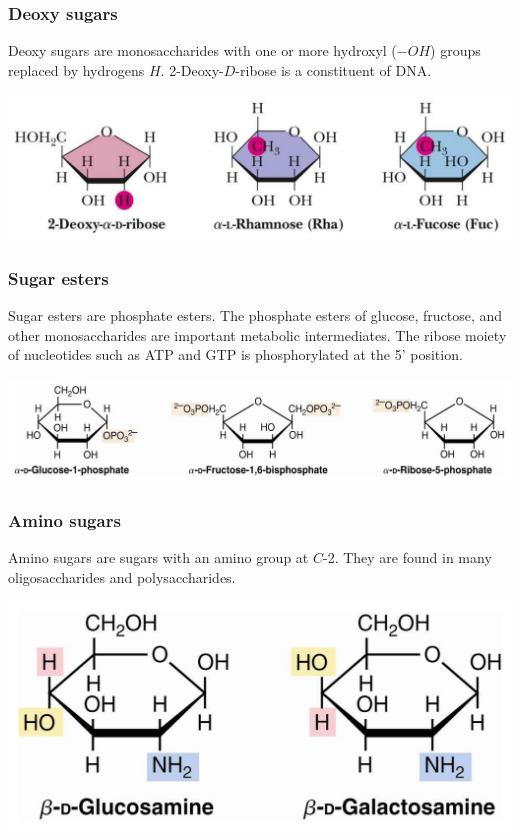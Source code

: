 \documentclass[11pt]{article}
\begin{document}
\newpage
\subsubsection{Deoxy sugars}
\label{sec:orga265d68}
Deoxy sugars are monosaccharides with one or more hydroxyl (\(-OH\)) groups replaced by hydrogens \(H\). 2-Deoxy-\(D\)-ribose is a constituent of DNA.
\begin{center}
\includegraphics[width=.9\linewidth]{./images/deoxy-sugars.png}
\end{center}
\subsubsection{Sugar esters}
\label{sec:orgddae3dc}
Sugar esters are phosphate esters. The phosphate esters of glucose, fructose, and other monosaccharides are important metabolic intermediates. The ribose moiety of nucleotides such as ATP and GTP is phosphorylated at the 5' position.
\begin{center}
\includegraphics[width=.9\linewidth]{./images/sugar-esters.png}
\end{center}
\subsubsection{Amino sugars}
\label{sec:orgf493dfc}
Amino sugars are sugars with an amino group at \(C\)-2. They are found in many oligosaccharides and polysaccharides.
\begin{center}
\includegraphics[width=.9\linewidth]{./images/amino-sugars.png}
\end{center}
\end{document}
